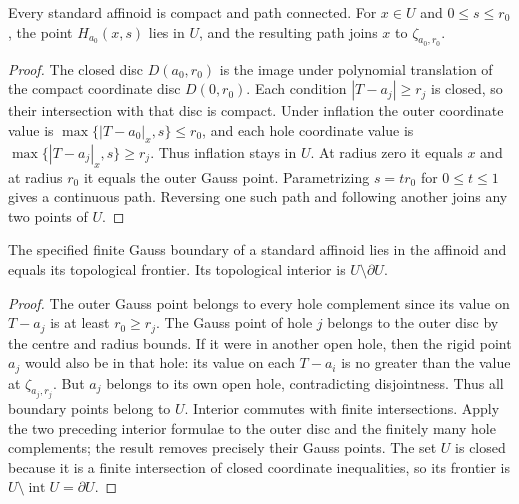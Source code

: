 \begin{lemma}\label{lem:fc-standard-inflation}
\leanok
Every standard affinoid is compact and path connected. For $x\in U$ and
$0\le s\le r_0$, the point $H_{a_0}(x,s)$ lies in $U$, and the resulting
path joins $x$ to $\zeta_{a_0,r_0}$.
\end{lemma}

\begin{proof}
The closed disc $D(a_0,r_0)$ is the image under polynomial translation of
the compact coordinate disc $D(0,r_0)$. Each condition
$|T-a_j|\ge r_j$ is closed, so their intersection with that disc is compact.
Under inflation the outer coordinate value is
$\max\{|T-a_0|_x,s\}\le r_0$, and each hole coordinate value is
$\max\{|T-a_j|_x,s\}\ge r_j$. Thus inflation stays in $U$.
At radius zero it equals $x$ and at radius $r_0$ it equals the outer Gauss
point. Parametrizing $s=t r_0$ for $0\le t\le1$ gives a continuous path.
Reversing one such path and following another joins any two points of $U$.
\end{proof}

\begin{lemma}\label{lem:fc-standard-boundary}
\leanok
The specified finite Gauss boundary of a standard affinoid lies in the affinoid
and equals its topological frontier. Its topological interior is
$U\setminus\partial U$.
\end{lemma}

\begin{proof}
The outer Gauss point belongs to every hole complement since its value on
$T-a_j$ is at least $r_0\ge r_j$. The Gauss point of hole $j$ belongs to the
outer disc by the centre and radius bounds. If it were in another open hole,
then the rigid point $a_j$ would also be in that hole: its value on each
$T-a_i$ is no greater than the value at $\zeta_{a_j,r_j}$. But $a_j$ belongs
to its own open hole, contradicting disjointness. Thus all boundary points
belong to $U$.
Interior commutes with finite intersections. Apply the two preceding
interior formulae to the outer disc and the finitely many hole complements;
the result removes precisely their Gauss points. The set $U$ is closed because
it is a finite intersection of closed coordinate inequalities, so its frontier
is $U\setminus\operatorname{int}U=\partial U$.
\end{proof}

